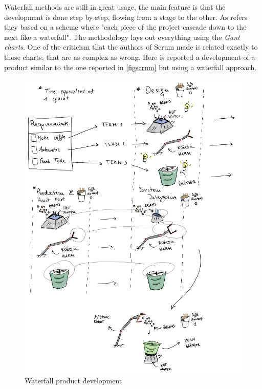 \documentclass[../main.tex]{subfiles}
\begin{document}
Waterfall methods are still in great usage, the main feature is that the development is done step by step, flowing from a stage to the other. As \cite{Scrum} refers they based on a scheme where "each piece of the project cascade down to the next like a waterfall". The methodology lays out everything using the \textit{Gant charts}. One of the criticism that the authors of Scrum made is related exactly to those charts, that are as complex as wrong. Here is reported a development of a product similar to the one reported in \ref{figscrum} but using a waterfall approach.\\
\begin{figure}[H]
    \centering
    \includegraphics[width=\linewidth]{images_folder/waterfall.png}
    \caption{Waterfall product development}
    \label{fig:scrumprddev}
\end{figure}
\end{document}
